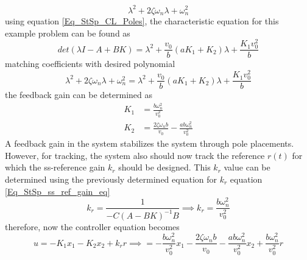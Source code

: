 \begin{equation}
	\lambda^{2} + 2 \zeta \omega_{n} \lambda + \omega_{n}^{2}
\end{equation}
using equation \eqref{Eq_StSp_CL_Poles}, the characteristic equation for this example problem can be found as
\begin{equation}
	det(\lambda I - A + BK) = \lambda^{2} + \frac{v_0}{b} (aK_{1} + K_{2}) \lambda + \frac{K_{1} v_{0}^{2}}{b}
\end{equation}
matching coefficients with desired polynomial
\begin{equation}
	\lambda^{2} + 2 \zeta \omega_{n} \lambda + \omega_{n}^{2} = \lambda^{2} + \frac{v_0}{b} (aK_{1} + K_{2}) \lambda + \frac{K_{1} v_{0}^{2}}{b}
\end{equation}
the feedback gain can be determined as
\begin{align}
	K_1 &= \frac{b \omega_{n}^{2}}{v_{0}^{2}} \\
	K_2 &= \frac{2 \zeta \omega_{n} b}{v_0} - \frac{a b \omega_{n}^{2}}{v_{0}^{2}}
\end{align}
A feedback gain in the system stabilizes the system through pole placements. However, for tracking, the system also should now track the reference $r(t)$ for which the ss-reference gain $k_r$ should be designed. This $k_r$ value can be determined using the previously determined equation for $k_r$ equation \eqref{Eq_StSp_ss_ref_gain_eq}
\begin{equation}
	k_r = \frac{1}{-C (A - B K)^{-1} B} \implies k_r = \frac{b \omega_{n}^{2}}{v_{0}^{2}}
\end{equation}
therefore, now the controller equation becomes
\begin{equation}
	u = -K_{1}x_{1} - K_{2}x_{2} + k_r r \implies = -\frac{b \omega_{n}^{2}}{v_{0}^{2}} x_{1} - \frac{2 \zeta \omega_{n} b}{v_0} - \frac{a b \omega_{n}^{2}}{v_{0}^{2}} x_{2} + \frac{b \omega_{n}^{2}}{v_{0}^{2}} r
\end{equation}

